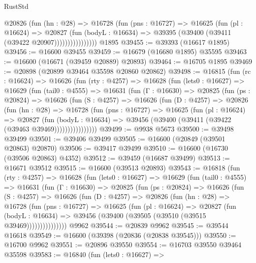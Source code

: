 \begin{lexlean}{RustStd}
\begin{coremodule}
                    @20826
                      (fun (hn : @28) =>
                      @16728
                        (fun (pns : @16727) =>
                        @16625
                          (fun (pl : @16624) =>
                          @20827
                            (fun (bodyL : @16634) =>
                            @39395 (@39400 (@39411 (@39422 @20907))))))))))))))))
    @1895
@39455 := @39393 (@16617 @1895)
@39456 := @16600 @39455
@39459 := @16679 (@16680 @1895) @35595
@39463 := @16600 (@16671 (@39459 @20889) @20893)
@39464 := @16705 @1895
@39469 := @20898 (@20899 @39464 @35598 @20860 @20862)
@39498 := @16815
    (fun (rc : @16624) =>
    @16626
      (fun (rty : @4257) =>
      @16628
        (fun (lets0 : @16627) =>
        @16629
          (fun (tail0 : @4555) =>
          @16631
            (fun (Γ : @16630) =>
            @20825
              (fun (ps : @20824) =>
              @16626
                (fun (S : @4257) =>
                @16626
                  (fun (D : @4257) =>
                  @20826
                    (fun (hn : @28) =>
                    @16728
                      (fun (pns : @16727) =>
                      @16625
                        (fun (pl : @16624) =>
                        @20827
                          (fun (bodyL : @16634) =>
                          @39456 (@39400 (@39411 (@39422 (@39463 @39469))))))))))))))))
@39499 := @9938 @5673
@39500 := @39498 @39499
@39501 := @39406 @39499
@39505 := @16600 (@20849 (@39501 @20863) @20870)
@39506 := @39417 @39499
@39510 := @16600 (@16730 (@39506 @20863) @4352)
@39512 := @39459 (@16687 @39499)
@39513 := @16671 @39512
@39515 := @16600 (@39513 @20893)
@39543 := @16818
    (fun (rty : @4257) =>
    @16628
      (fun (lets0 : @16627) =>
      @16629
        (fun (tail0 : @4555) =>
        @16631
          (fun (Γ : @16630) =>
          @20825
            (fun (ps : @20824) =>
            @16626
              (fun (S : @4257) =>
              @16626
                (fun (D : @4257) =>
                @20826
                  (fun (hn : @28) =>
                  @16728
                    (fun (pns : @16727) =>
                    @16625
                      (fun (pl : @16624) =>
                      @20827
                        (fun (bodyL : @16634) =>
                        @39456 (@39400 (@39505 (@39510 (@39515 @39469)))))))))))))))
    @9962
@39544 := @20839 @9962
@39545 := @39544 @16618
@39549 := @16600 (@39398 (@20836 (@20838 @39545)))
@39550 := @16700 @9962
@39551 := @20896 @39550
@39554 := @16703 @39550 @39464 @35598
@39583 := @16840
    (fun (lets0 : @16627) =>

\end{coremodule}
\end{lexlean}
